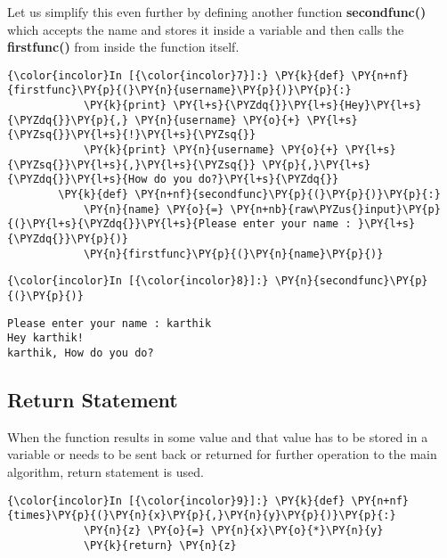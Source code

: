     Let us simplify this even further by defining another function
\textbf{secondfunc()} which accepts the name and stores it inside a
variable and then calls the \textbf{firstfunc()} from inside the
function itself.

    \begin{Verbatim}[commandchars=\\\{\}]
{\color{incolor}In [{\color{incolor}7}]:} \PY{k}{def} \PY{n+nf}{firstfunc}\PY{p}{(}\PY{n}{username}\PY{p}{)}\PY{p}{:}
            \PY{k}{print} \PY{l+s}{\PYZdq{}}\PY{l+s}{Hey}\PY{l+s}{\PYZdq{}}\PY{p}{,} \PY{n}{username} \PY{o}{+} \PY{l+s}{\PYZsq{}}\PY{l+s}{!}\PY{l+s}{\PYZsq{}}
            \PY{k}{print} \PY{n}{username} \PY{o}{+} \PY{l+s}{\PYZsq{}}\PY{l+s}{,}\PY{l+s}{\PYZsq{}} \PY{p}{,}\PY{l+s}{\PYZdq{}}\PY{l+s}{How do you do?}\PY{l+s}{\PYZdq{}}
        \PY{k}{def} \PY{n+nf}{secondfunc}\PY{p}{(}\PY{p}{)}\PY{p}{:}
            \PY{n}{name} \PY{o}{=} \PY{n+nb}{raw\PYZus{}input}\PY{p}{(}\PY{l+s}{\PYZdq{}}\PY{l+s}{Please enter your name : }\PY{l+s}{\PYZdq{}}\PY{p}{)}
            \PY{n}{firstfunc}\PY{p}{(}\PY{n}{name}\PY{p}{)}
\end{Verbatim}

    \begin{Verbatim}[commandchars=\\\{\}]
{\color{incolor}In [{\color{incolor}8}]:} \PY{n}{secondfunc}\PY{p}{(}\PY{p}{)}
\end{Verbatim}

    \begin{Verbatim}[commandchars=\\\{\}]
Please enter your name : karthik
Hey karthik!
karthik, How do you do?
    \end{Verbatim}

    \subsection{Return Statement}\label{return-statement}

    When the function results in some value and that value has to be stored
in a variable or needs to be sent back or returned for further operation
to the main algorithm, return statement is used.

    \begin{Verbatim}[commandchars=\\\{\}]
{\color{incolor}In [{\color{incolor}9}]:} \PY{k}{def} \PY{n+nf}{times}\PY{p}{(}\PY{n}{x}\PY{p}{,}\PY{n}{y}\PY{p}{)}\PY{p}{:}
            \PY{n}{z} \PY{o}{=} \PY{n}{x}\PY{o}{*}\PY{n}{y}
            \PY{k}{return} \PY{n}{z}
\end{Verbatim}

